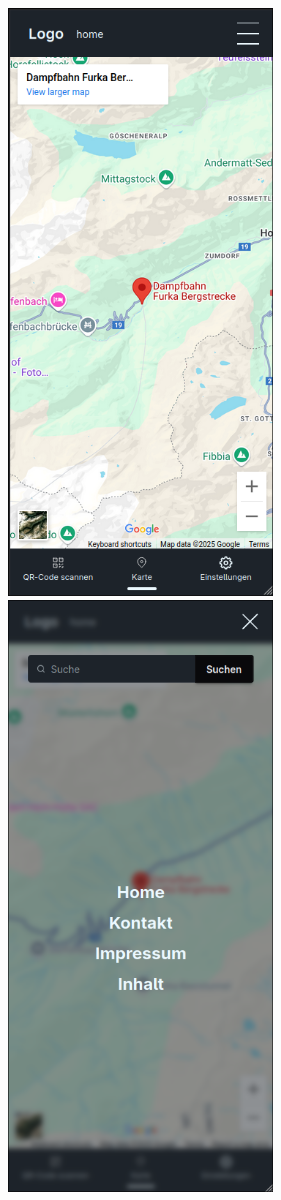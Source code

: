 \documentclass[10pt]{article}
\begin{document}
	\includegraphics[width=7cm ]{mainpage}
	\includegraphics[width=7cm ]{searchpage}
\end{document}
